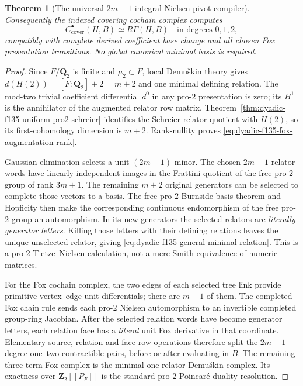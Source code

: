 \documentclass[11pt]{article}
\newtheorem{theorem}{Theorem}[section]
\theoremstyle{definition}
\begin{document}
\begin{theorem}[The universal $2m-1$ integral Nielsen pivot compiler]
Consequently the
indexed covering
cochain complex
computes
\begin{equation}\label{eq:dyadic-f135-uniform-schreier-rgamma}
\boxed{\quad
C_{\mathrm{cover}}^\bullet(H,B)
\simeq
R\Gamma(H,B)
\quad\text{in degrees }0,1,2,
\quad}
\end{equation}
compatibly with
complete derived
coefficient base
change and
all chosen
Fox presentation
transitions.
No global canonical
minimal basis is
required.
\end{theorem}

\begin{proof}
Since $F/\mathbf Q_2$
is finite and
$\mu_2\subset F$,
local Demu\v{s}kin
theory
\cite{NSW,LabuteClassification}
gives
$d(H(2))=[F:\mathbf Q_2]+2=m+2$
and one minimal
defining relation.
The mod-two trivial
coefficient differential
$d^0$ in any
pro-$2$ presentation
is zero; its
$H^1$ is the
annihilator of the
augmented relator
row matrix.
Theorem~\ref{thm:dyadic-f135-uniform-pro2-schreier}
identifies the
Schreier relator
quotient with
$H(2)$, so its
first-cohomology
dimension is
$m+2$.
Rank-nullity
proves
\eqref{eq:dyadic-f135-fox-augmentation-rank}.

Gaussian elimination
selects a unit
$(2m-1)$-minor.
The chosen
$2m-1$ relator
words have
linearly independent
images in the
Frattini quotient
of the free
pro-$2$ group
of rank $3m+1$.
The remaining
$m+2$ original
generators can
be selected to
complete those
vectors to a
basis.
The free
pro-$2$ Burnside
basis theorem
and Hopficity
then make the
corresponding
continuous
endomorphism
of the free
pro-$2$ group
an automorphism.
In its new
generators the
selected relators
are \emph{literally
generator letters}.
Killing those
letters with
their defining
relations leaves
the unique
unselected
relator, giving
\eqref{eq:dyadic-f135-general-minimal-relation}.
This is a
pro-$2$
Tietze--Nielsen
calculation, not
a mere Smith
equivalence of
numeric matrices.

For the Fox
cochain complex,
the two edges
of each selected
tree link provide
primitive
vertex--edge
unit differentials;
there are
$m-1$ of them.
The completed
Fox chain rule
sends each
pro-$2$ Nielsen
automorphism
to an invertible
completed
group-ring
Jacobian.
After the
selected relation
words have become
generator letters,
each relation
face has a
\emph{literal}
unit Fox derivative
in that coordinate.
Elementary
source, relation
and face
row operations
therefore split
the $2m-1$
degree-one--two
contractible
pairs, before
or after
evaluating
in $B$.
The remaining
three-term Fox
complex is
the minimal
one-relator
Demu\v{s}kin
complex.
Its exactness
over
$\mathbf Z_2[[P_F]]$
is the standard
pro-$2$
Poincar\'e
duality resolution.


\end{proof}
\end{document}
